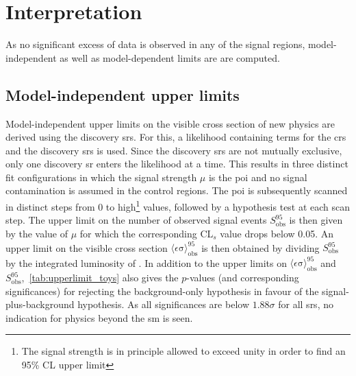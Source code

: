 \FloatBarrier

\section{Interpretation}\label{sec:results_interpretation}

As no significant excess of data is observed in any of the signal regions, model-independent as well as model-dependent limits are are computed.

\subsection{Model-independent upper limits} 

Model-independent upper limits on the visible cross section of new physics are derived using the discovery \glspl{sr}. For this, a likelihood containing terms for the \glspl{cr} and the discovery \glspl{sr} is used. Since the discovery \glspl{sr} are not mutually exclusive, only one discovery \gls{sr} enters the likelihood at a time. This results in three distinct fit configurations in which the signal strength $\mu$ is the \gls{poi} and no signal contamination is assumed in the control regions. The \gls{poi} is subsequently scanned in distinct steps from 0 to high\footnote{The signal strength is in principle allowed to exceed unity in order to find an 95\% CL upper limit} values, followed by a hypothesis test at each scan step. The upper limit on the number of observed signal events $S_{\mathrm{ obs}}^{95}$ is then given by the value of $\mu$ for which the corresponding CL$_s$ value drops below 0.05. An upper limit on the visible cross section $\langle\epsilon{\mathrm{ \sigma}}\rangle_{\mathrm{ obs}}^{95}$ is then obtained by dividing $S_{\mathrm{ obs}}^{95}$ by the integrated luminosity of \onethirtynineifb. In addition to the upper limits on $\langle\epsilon{\mathrm{ \sigma}}\rangle_{\mathrm{ obs}}^{95}$ and $S_{\mathrm{ obs}}^{95}$,~\cref{tab:upperlimit_toys} also gives the $p$-values (and corresponding significances) for rejecting the background-only hypothesis in favour of the signal-plus-background hypothesis. As all significances are below $1.88\sigma$ for all \glspl{sr}, no indication for physics beyond the \gls{sm} is seen.

